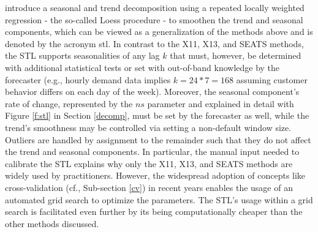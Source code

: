 \cite{cleveland1990} introduce a seasonal and trend decomposition using a
    repeated locally weighted regression - the so-called Loess procedure - to
    smoothen the trend and seasonal components, which can be viewed as a
    generalization of the methods above and is denoted by the acronym
    \gls{stl}.
In contrast to the X11, X13, and SEATS methods, the STL supports seasonalities
    of any lag $k$ that must, however, be determined with additional
    statistical tests or set with out-of-band knowledge by the forecaster
    (e.g., hourly demand data implies $k = 24 * 7 = 168$ assuming customer
    behavior differs on each day of the week).
Moreover, the seasonal component's rate of change, represented by the $ns$
    parameter and explained in detail with Figure \ref{f:stl} in Section
    \ref{decomp}, must be set by the forecaster as well, while the trend's
    smoothness may be controlled via setting a non-default window size.
Outliers are handled by assignment to the remainder such that they do not
    affect the trend and seasonal components.
In particular, the manual input needed to calibrate the STL explains why only
    the X11, X13, and SEATS methods are widely used by practitioners.
However, the widespread adoption of concepts like cross-validation (cf.,
    Sub-section \ref{cv}) in recent years enables the usage of an automated
    grid search to optimize the parameters.
The STL's usage within a grid search is facilitated even further by its being
    computationally cheaper than the other methods discussed.
